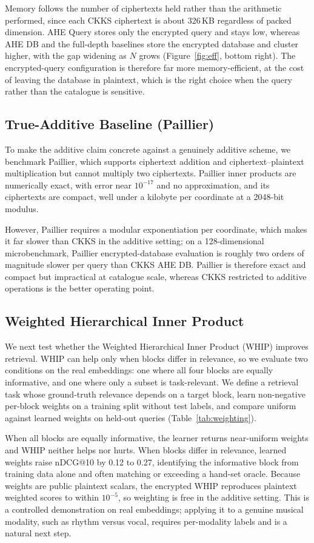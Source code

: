 \documentclass[sigconf,nonacm]{acmart}
\begin{document}
Memory follows the number of ciphertexts held rather than the arithmetic performed, since each CKKS ciphertext is about 326\,KB regardless of packed dimension. AHE Query stores only the encrypted query and stays low, whereas AHE DB and the full-depth baselines store the encrypted database and cluster higher, with the gap widening as $N$ grows (Figure~\ref{fig:eff}, bottom right). The encrypted-query configuration is therefore far more memory-efficient, at the cost of leaving the database in plaintext, which is the right choice when the query rather than the catalogue is sensitive.

\subsection{True-Additive Baseline (Paillier)}
\label{sec:paillier}
To make the additive claim concrete against a genuinely additive scheme, we benchmark Paillier, which supports ciphertext addition and ciphertext--plaintext multiplication but cannot multiply two ciphertexts. Paillier inner products are numerically exact, with error near $10^{-17}$ and no approximation, and its ciphertexts are compact, well under a kilobyte per coordinate at a 2048-bit modulus.

However, Paillier requires a modular exponentiation per coordinate, which makes it far slower than CKKS in the additive setting; on a 128-dimensional microbenchmark, Paillier encrypted-database evaluation is roughly two orders of magnitude slower per query than CKKS AHE DB. Paillier is therefore exact and compact but impractical at catalogue scale, whereas CKKS restricted to additive operations is the better operating point.

\subsection{Weighted Hierarchical Inner Product}
\label{sec:weighting}
We next test whether the Weighted Hierarchical Inner Product (WHIP) improves retrieval. WHIP can help only when blocks differ in relevance, so we evaluate two conditions on the real embeddings: one where all four blocks are equally informative, and one where only a subset is task-relevant. We define a retrieval task whose ground-truth relevance depends on a target block, learn non-negative per-block weights on a training split without test labels, and compare uniform against learned weights on held-out queries (Table~\ref{tab:weighting}).

When all blocks are equally informative, the learner returns near-uniform weights and WHIP neither helps nor hurts. When blocks differ in relevance, learned weights raise nDCG@10 by 0.12 to 0.27, identifying the informative block from training data alone and often matching or exceeding a hand-set oracle. Because weights are public plaintext scalars, the encrypted WHIP reproduces plaintext weighted scores to within $10^{-5}$, so weighting is free in the additive setting. This is a controlled demonstration on real embeddings; applying it to a genuine musical modality, such as rhythm versus vocal, requires per-modality labels and is a natural next step.
\end{document}
